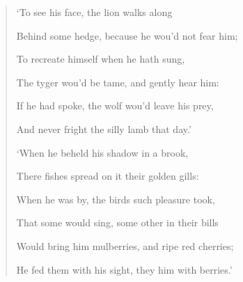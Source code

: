 \documentclass[a4paper, 11pt, oneside, polutonikogreek, english]{article}
\begin{document}
\begin{quotation}
\bigskip

`To see his face, the lion walks along

Behind some hedge, because he wou'd not fear him;

To recreate himself when he hath sung,

The tyger wou'd be tame, and gently hear him:

\hspace*{15mm}If he had spoke, the wolf wou'd leave his prey,

\hspace*{15mm}And never fright the silly lamb that day.'

\bigskip

`When he beheld his shadow in a brook,

There fishes spread on it their golden gills:

When he was by, the birds such pleasure took,

That some would sing, some other in their bills

\hspace*{15mm}Would bring him mulberries, and ripe red cherries;

\hspace*{15mm}He fed them with his sight, they him with berries.'
\end{quotation}
\end{document}
